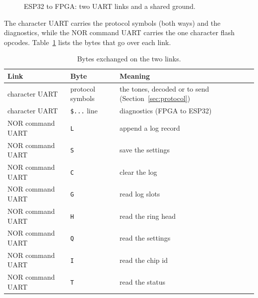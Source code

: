 \documentclass[a4paper,10pt]{article}
\begin{document}
\begin{figure}[H]
\centering
{}
\caption{ESP32 to FPGA: two UART links and a shared ground.}
\label{fig:esp-link}
\end{figure}

The character UART carries the protocol symbols (both ways) and the diagnostics, while the
NOR command UART carries the one character flash opcodes. Table~\ref{tab:esp-opcodes} lists
the bytes that go over each link.

\begin{table}[H]
\centering
\caption{Bytes exchanged on the two links.}
\label{tab:esp-opcodes}
\begin{tabular}{lll}
\hline
Link & Byte & Meaning \\
\hline
character UART & protocol symbols & the tones, decoded or to send (Section~\ref{sec:protocol}) \\
character UART & \texttt{\$...} line & diagnostics (FPGA to ESP32) \\
NOR command UART & \texttt{L} & append a log record \\
NOR command UART & \texttt{S} & save the settings \\
NOR command UART & \texttt{C} & clear the log \\
NOR command UART & \texttt{G} & read log slots \\
NOR command UART & \texttt{H} & read the ring head \\
NOR command UART & \texttt{Q} & read the settings \\
NOR command UART & \texttt{I} & read the chip id \\
NOR command UART & \texttt{T} & read the status \\
\hline
\end{tabular}
\end{table}
\end{document}
